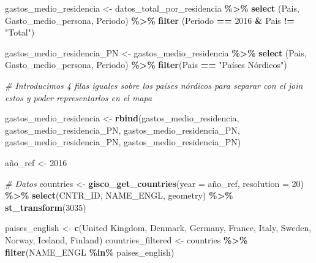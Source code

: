 \documentclass[data,article,submit,moreauthors,pdftex]{Definitions/mdpi}
\newenvironment{Shaded}{\begin{snugshade}}{\end{snugshade}}
\newcommand{\AttributeTok}[1]{\textcolor[rgb]{0.13,0.29,0.53}{#1}}
\newcommand{\CommentTok}[1]{\textcolor[rgb]{0.56,0.35,0.01}{\textit{#1}}}
\newcommand{\DecValTok}[1]{\textcolor[rgb]{0.00,0.00,0.81}{#1}}
\newcommand{\FunctionTok}[1]{\textcolor[rgb]{0.13,0.29,0.53}{\textbf{#1}}}
\newcommand{\NormalTok}[1]{#1}
\newcommand{\OtherTok}[1]{\textcolor[rgb]{0.56,0.35,0.01}{#1}}
\newcommand{\SpecialCharTok}[1]{\textcolor[rgb]{0.81,0.36,0.00}{\textbf{#1}}}
\newcommand{\StringTok}[1]{\textcolor[rgb]{0.31,0.60,0.02}{#1}}
\begin{document}
\begin{Shaded}
\begin{Highlighting}[]
\NormalTok{gastos\_medio\_residencia }\OtherTok{\textless{}{-}}\NormalTok{ datos\_total\_por\_residencia }\SpecialCharTok{\%\textgreater{}\%} 
  \FunctionTok{select}\NormalTok{ (Pais, Gasto\_medio\_persona, Periodo) }\SpecialCharTok{\%\textgreater{}\%}
  \FunctionTok{filter}\NormalTok{ (Periodo }\SpecialCharTok{==} \StringTok{\textquotesingle{}2016\textquotesingle{}} \SpecialCharTok{\&}\NormalTok{ Pais }\SpecialCharTok{!=} \StringTok{"Total"}\NormalTok{)}

\NormalTok{gastos\_medio\_residencia\_PN }\OtherTok{\textless{}{-}}\NormalTok{ gastos\_medio\_residencia }\SpecialCharTok{\%\textgreater{}\%} 
  \FunctionTok{select}\NormalTok{ (Pais, Gasto\_medio\_persona, Periodo) }\SpecialCharTok{\%\textgreater{}\%}
  \FunctionTok{filter}\NormalTok{(Pais }\SpecialCharTok{==} \StringTok{"Países Nórdicos"}\NormalTok{)}

\CommentTok{\# Introducimos 4 filas iguales sobre los países nórdicos para separar con el join estos y poder representarlos en el mapa}

\NormalTok{gastos\_medio\_residencia }\OtherTok{\textless{}{-}} \FunctionTok{rbind}\NormalTok{(gastos\_medio\_residencia, gastos\_medio\_residencia\_PN,}
\NormalTok{                                 gastos\_medio\_residencia\_PN, gastos\_medio\_residencia\_PN, gastos\_medio\_residencia\_PN)}

\NormalTok{año\_ref }\OtherTok{\textless{}{-}} \DecValTok{2016}

\CommentTok{\# Datos}
\NormalTok{countries }\OtherTok{\textless{}{-}} \FunctionTok{gisco\_get\_countries}\NormalTok{(}\AttributeTok{year =}\NormalTok{ año\_ref,}
                        \AttributeTok{resolution =} \DecValTok{20}\NormalTok{) }\SpecialCharTok{\%\textgreater{}\%}
  \FunctionTok{select}\NormalTok{(CNTR\_ID, NAME\_ENGL, geometry) }\SpecialCharTok{\%\textgreater{}\%}
           \FunctionTok{st\_transform}\NormalTok{(}\DecValTok{3035}\NormalTok{)}

\NormalTok{paises\_english }\OtherTok{\textless{}{-}} \FunctionTok{c}\NormalTok{(}\StringTok{\textquotesingle{}United Kingdom\textquotesingle{}}\NormalTok{, }\StringTok{\textquotesingle{}Denmark\textquotesingle{}}\NormalTok{, }\StringTok{\textquotesingle{}Germany\textquotesingle{}}\NormalTok{, }\StringTok{\textquotesingle{}France\textquotesingle{}}\NormalTok{, }\StringTok{\textquotesingle{}Italy\textquotesingle{}}\NormalTok{, }\StringTok{\textquotesingle{}Sweden\textquotesingle{}}\NormalTok{, }\StringTok{\textquotesingle{}Norway\textquotesingle{}}\NormalTok{, }\StringTok{\textquotesingle{}Iceland\textquotesingle{}}\NormalTok{, }\StringTok{\textquotesingle{}Finland\textquotesingle{}}\NormalTok{)}
\NormalTok{countries\_filtered }\OtherTok{\textless{}{-}}\NormalTok{ countries }\SpecialCharTok{\%\textgreater{}\%} \FunctionTok{filter}\NormalTok{(NAME\_ENGL }\SpecialCharTok{\%in\%}\NormalTok{ paises\_english)}


\end{Highlighting}
\end{Shaded}
\end{document}
